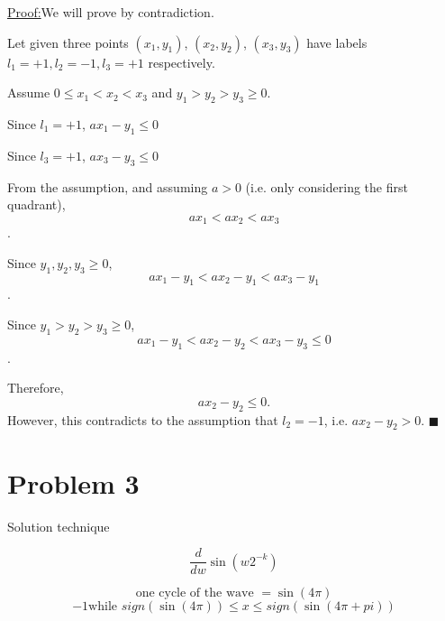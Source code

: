 \documentclass[11pt]{article}
\newenvironment{claimproof}[1]{\par\noindent\underline{Proof:}\space#1}{\hfill $\blacksquare$}
\begin{document}
\begin{claimproof}
We will prove by contradiction.

Let given three points $(x_1, y_1)$, $(x_2, y_2)$, $(x_3, y_3)$ have labels ${l_1 = +1, l_2 = -1, l_3 = +1}$ respectively.

Assume $0 \leq x_1 < x_2 < x_3$ and $y_1 > y_2 > y_3 \geq 0$.

Since $l_1 = +1$, $ax_1 - y_1 \leq 0$

Since $l_3 = +1$, $ax_3 - y_3 \leq 0$

From the assumption, and assuming $a > 0$ (i.e. only considering the first quadrant), $$ax_1 < ax_2 < ax_3$$. 

Since $y_1, y_2, y_3 \geq 0$, $$ax_1 - y_1 < ax_2 - y_1 < ax_3 - y_1$$.

Since $y_1 > y_2 > y_3 \geq 0$, $$ax_1 - y_1 < ax_2 - y_2 < ax_3 - y_3 \leq 0$$.

Therefore,$$ax_2 - y_2 \leq 0.$$
However, this contradicts to the assumption that $l_2 = -1$, i.e. $ax_2 - y_2 > 0$.
\end{claimproof}


\section{Problem 3}
Solution technique

$$
\frac{d}{dw} \sin(w2^{-k})
$$

$$
\mbox{one cycle of the wave }= \sin(4\pi)
$$
$$
-1 \mbox{while } sign(\sin(4\pi)) \leq x \leq sign(\sin(4\pi + pi))
$$
\end{document}
